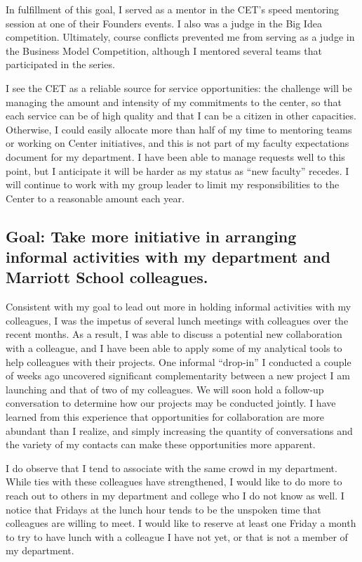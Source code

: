\documentclass[11pt,article,oneside]{memoir}
\begin{document}
In fulfillment of this goal, I served as a mentor in the CET's speed
mentoring session at one of their Founders events. I also was a judge in
the Big Idea competition. Ultimately, course conflicts prevented me from
serving as a judge in the Business Model Competition, although I
mentored several teams that participated in the series.

I see the CET as a reliable source for service opportunities: the
challenge will be managing the amount and intensity of my commitments to
the center, so that each service can be of high quality and that I can
be a citizen in other capacities. Otherwise, I could easily allocate
more than half of my time to mentoring teams or working on Center
initiatives, and this is not part of my faculty expectations document
for my department. I have been able to manage requests well to this
point, but I anticipate it will be harder as my status as \enquote{new
faculty} recedes. I will continue to work with my group leader to limit
my responsibilities to the Center to a reasonable amount each year.

\subsection{Goal: Take more initiative in arranging informal activities
with my department and Marriott School
colleagues.}\label{goal-take-more-initiative-in-arranging-informal-activities-with-my-department-and-marriott-school-colleagues.}

Consistent with my goal to lead out more in holding informal activities
with my colleagues, I was the impetus of several lunch meetings with
colleagues over the recent months. As a result, I was able to discuss a
potential new collaboration with a colleague, and I have been able to
apply some of my analytical tools to help colleagues with their
projects. One informal \enquote{drop-in} I conducted a couple of weeks
ago uncovered significant complementarity between a new project I am
launching and that of two of my colleagues. We will soon hold a
follow-up conversation to determine how our projects may be conducted
jointly. I have learned from this experience that opportunities for
collaboration are more abundant than I realize, and simply increasing
the quantity of conversations and the variety of my contacts can make
these opportunities more apparent.

I do observe that I tend to associate with the same crowd in my
department. While ties with these colleagues have strengthened, I would
like to do more to reach out to others in my department and college who
I do not know as well. I notice that Fridays at the lunch hour tends to
be the unspoken time that colleagues are willing to meet. I would like
to reserve at least one Friday a month to try to have lunch with a
colleague I have not yet, or that is not a member of my department.
\end{document}
